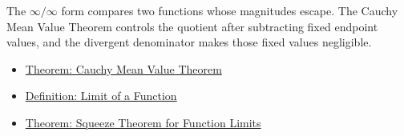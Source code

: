 \begin{remark*}[Interpretation]
The \(\infty/\infty\) form compares two functions whose magnitudes escape. The Cauchy Mean Value Theorem controls the quotient after subtracting fixed endpoint values, and the divergent denominator makes those fixed values negligible.
\end{remark*}

\begin{dependencies}
\begin{itemize}
  \item \hyperref[thm:cauchy-mean-value-theorem]{Theorem: Cauchy Mean Value Theorem}
  \item \hyperref[def:limit-function]{Definition: Limit of a Function}
  \item \hyperref[thm:squeeze-function-limits]{Theorem: Squeeze Theorem for Function Limits}
\end{itemize}
\end{dependencies}
